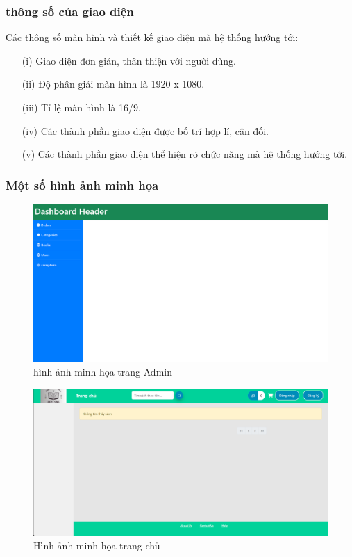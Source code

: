 \documentclass[../DoAn.tex]{subfiles}
\begin{document}
\subsubsection{thông số của giao diện}
Các thông số màn hình và thiết kế giao diện mà hệ thống hướng tới: 
\begin{enumerate}
    \item[(i)] Giao diện đơn giản, thân thiện với người dùng.
    \item[(ii)] Độ phân giải màn hình là 1920 x 1080.
    \item[(iii)] Tỉ lệ màn hình là 16/9.
    \item[(iv)] Các thành phần giao diện được bố trí hợp lí, cân đối.
    \item[(v)] Các thành phần giao diện thể hiện rõ chức năng mà hệ thống hướng tới. 
\end{enumerate}


\subsubsection{Một số hình ảnh minh họa}

\begin{figure}[H]
    \centering
    \includegraphics[width=1\linewidth]{Hinhve/admin.png}
    \caption{hình ảnh minh họa trang Admin}
    \label{fig:admin}
\end{figure}

\begin{figure}[H]
    \centering
    \includegraphics[width=1\linewidth]{Hinhve/home.png}
    \caption{Hình ảnh minh họa trang chủ}
    \label{fig:home}
\end{figure}
\end{document}
